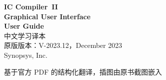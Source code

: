 \documentclass[UTF8,a4paper,openany,oneside]{ctexbook}
\begin{document}
\begin{titlepage}
  \centering
  \vspace*{2cm}
  {\Huge\bfseries IC Compiler\texttrademark\ II}\\[0.6em]
  {\Huge\bfseries Graphical User Interface}\\[0.3em]
  {\Huge\bfseries User Guide}\\[1.2em]
  {\LARGE 中文学习译本}\\[2em]
  {\large 原版版本：V-2023.12，December 2023}\\[0.5em]
  {\large Synopsys, Inc.}\\[3em]
  \begin{minipage}{0.85\textwidth}
    \copyrightnotice
  \end{minipage}
  \vfill
  {\large 基于官方 PDF 的结构化翻译，插图由原书截图嵌入}
\end{titlepage}

\frontmatter
\tableofcontents
\clearpage


\mainmatter



















\end{document}
